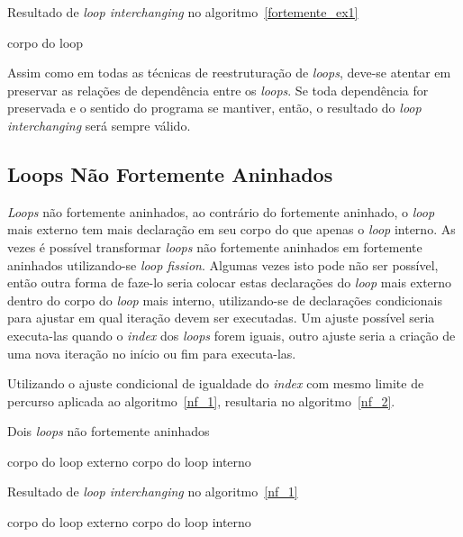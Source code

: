 \begin{algorithm}
\caption{Resultado de \textit{loop interchanging} no
        algoritmo~\ref{fortemente_ex1}}
\label{fortemente_ex2}
\begin{algorithmic}[1]

\STATE corpo do loop
\ENDFOR
\ENDFOR

\end{algorithmic}
\end{algorithm}

Assim como em todas as técnicas de reestruturação de \textit{loops}, deve-se
atentar em preservar as relações de dependência entre os \textit{loops}. 
Se toda dependência for preservada e o sentido do programa se mantiver, então, o
resultado do \textit{loop interchanging} será sempre válido.


\subsection{Loops Não Fortemente Aninhados}

\textit{Loops} não fortemente aninhados, ao contrário do fortemente aninhado, o
\textit{loop} mais externo tem mais declaração em seu corpo do que apenas o
\textit{loop} interno.
As vezes é  possível  transformar  \textit{loops} não fortemente aninhados em
fortemente aninhados utilizando-se \textit{loop fission}.
Algumas vezes isto pode não ser possível, então outra forma de faze-lo seria
colocar estas declarações do \textit{loop} mais externo dentro do corpo do
\textit{loop} mais interno, utilizando-se de declarações condicionais para
ajustar em qual iteração devem ser executadas. 
Um ajuste possível seria executa-las quando o \textit{index} dos \textit{loops}
forem iguais, outro ajuste seria a criação de uma nova iteração no início ou fim
para executa-las.

Utilizando o ajuste condicional de igualdade  do \textit{index} com mesmo limite
de percurso aplicada ao algoritmo~\ref{nf_1}, resultaria no
algoritmo~\ref{nf_2}.

\begin{algorithm}
\caption{Dois \textit{loops} não fortemente aninhados}
\label{nf_1}
\begin{algorithmic}[1]

\STATE corpo do loop externo
\STATE corpo do loop interno
\ENDFOR
\ENDFOR

\end{algorithmic}
\end{algorithm}

\begin{algorithm}
\caption{Resultado de \textit{loop interchanging} no algoritmo~\ref{nf_1}}
\label{nf_2}
\begin{algorithmic}[1]

\STATE corpo do loop externo
\ELSE
\STATE corpo do loop interno
\ENDIF
\ENDFOR
\ENDFOR

\end{algorithmic}
\end{algorithm}


